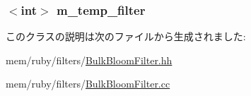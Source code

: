 \label{classBulkBloomFilter_a207a98f5eec97a24c867c9b015435435}
\hypertarget{classBulkBloomFilter_ac3f1f95f7f292549371b599b945e9e0a}{
\subsubsection[{m\_\-temp\_\-filter}]{$<$int$>$ {\bf m\_\-temp\_\-filter}}}
\label{classBulkBloomFilter_ac3f1f95f7f292549371b599b945e9e0a}


このクラスの説明は次のファイルから生成されました:\begin{DoxyCompactItemize}
\item 
mem/ruby/filters/\hyperlink{BulkBloomFilter_8hh}{BulkBloomFilter.hh}\item 
mem/ruby/filters/\hyperlink{BulkBloomFilter_8cc}{BulkBloomFilter.cc}\end{DoxyCompactItemize}
